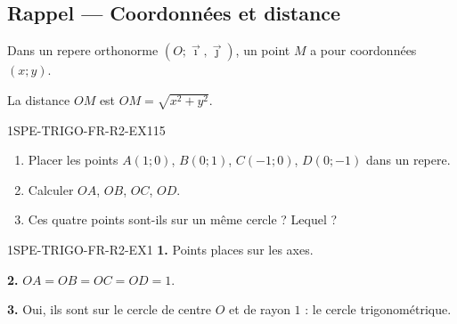 

\subsection*{Rappel — Coordonnées et distance}

Dans un repere orthonorme $(O;\vec{\imath},\vec{\jmath})$, un point $M$ a pour coordonnées $(x;y)$.

La distance $OM$ est $OM = \sqrt{x^2 + y^2}$.

\begin{exercice}{1SPE-TRIGO-FR-R2-EX1}{1}{5}
\begin{enumerate}
  \item Placer les points $A(1;0)$, $B(0;1)$, $C(-1;0)$, $D(0;-1)$ dans un repere.
  \item Calculer $OA$, $OB$, $OC$, $OD$.
  \item Ces quatre points sont-ils sur un même cercle ? Lequel ?
\end{enumerate}
\end{exercice}


\begin{corrige}{1SPE-TRIGO-FR-R2-EX1}
\textbf{1.} Points places sur les axes.

\textbf{2.} $OA = OB = OC = OD = 1$.

\textbf{3.} Oui, ils sont sur le cercle de centre $O$ et de rayon $1$ : le cercle trigonométrique.
\end{corrige}
